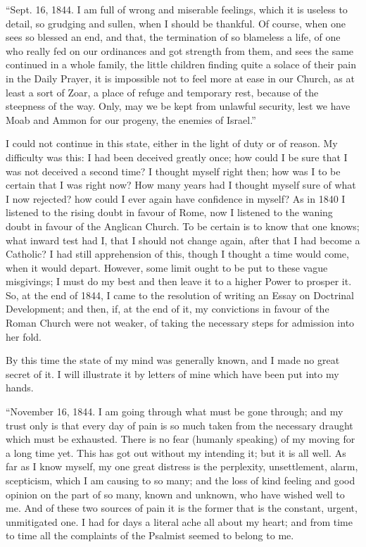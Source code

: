``Sept. 16, 1844. I am full of wrong and miserable feelings,
which it is useless to detail, so grudging and sullen, when I should be
thankful. Of course, when one sees so blessed an end, and that, the
termination of so blameless a life, of one who really fed on our
ordinances and got strength from them, and sees the same continued in a
whole family, the little children finding quite a solace of their pain
in the Daily Prayer, it is impossible not to feel more at ease in our
Church, as at least a sort of Zoar, a place of refuge and temporary
rest, because of the steepness of the way. Only, may we be kept from
unlawful security, lest we have Moab and Ammon for our progeny, the
enemies of Israel.''

I could not continue in this state, either in the light of duty or of
reason. My difficulty was this: I had been deceived greatly once; how
could I be sure that I was not deceived a second time? I thought
myself right then; how was I to be certain that I was right now?
How many years had I thought myself sure of what I now rejected? how
could I ever again have confidence in myself? As in 1840 I listened to
the rising doubt in favour of Rome, now I listened to the waning doubt
in favour of the Anglican Church. To be certain is to know
that one knows; what inward test had I, that I should not change
again, after that I had become a Catholic? I had still apprehension of
this, though I thought a time would come, when it would depart. However,
some limit ought to be put to these vague misgivings; I must do my best
and then leave it to a higher Power to prosper it. So, at
the end of 1844, I came to the resolution of writing an Essay on
Doctrinal Development; and then, if, at the end of it, my
convictions in favour of the Roman Church were not weaker, of taking the necessary steps for
admission into her fold.

By this time the state of my mind was generally known, and I made
no great secret of it. I will illustrate it by letters of mine which
have been put into my hands.

``November 16, 1844. I am going through what must be gone
through; and my trust only is that every day of pain is so much taken
from the necessary draught which must be exhausted. There is no fear
(humanly speaking) of my moving for a long time yet. This has got out
without my intending it; but it is all well. As far as I know myself, my
one great distress is the perplexity, unsettlement, alarm, scepticism,
which I am causing to so many; and the loss of kind feeling and good
opinion on the part of so many, known and unknown, who have wished well
to me. And of these two sources of pain it is the former that is the
constant, urgent, unmitigated one. I had for days a literal ache all
about my heart; and from time to time all the complaints of the Psalmist
seemed to belong to me.

